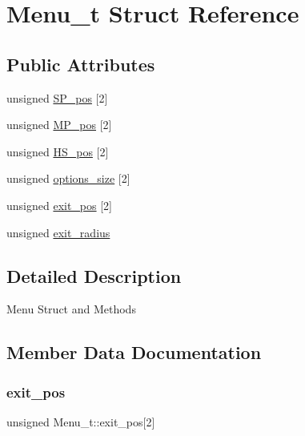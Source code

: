 \hypertarget{struct_menu__t}{}\section{Menu\+\_\+t Struct Reference}
\label{struct_menu__t}
\subsection*{Public Attributes}
\begin{DoxyCompactItemize}
\item 
unsigned \hyperlink{struct_menu__t_a73413f3fc2848f75e731c17a4ba51f74}{S\+P\+\_\+pos} \mbox{[}2\mbox{]}
\item 
unsigned \hyperlink{struct_menu__t_a252b5ddb2d7e97a790ef0a5d95af6078}{M\+P\+\_\+pos} \mbox{[}2\mbox{]}
\item 
unsigned \hyperlink{struct_menu__t_ae3ed027861d6123a178a82a6f60fdb74}{H\+S\+\_\+pos} \mbox{[}2\mbox{]}
\item 
unsigned \hyperlink{struct_menu__t_a7d1e90a9edc6dacce833bb39ab75e1e3}{options\+\_\+size} \mbox{[}2\mbox{]}
\item 
unsigned \hyperlink{struct_menu__t_ad826ecbf028d96d83976029b06fff7fb}{exit\+\_\+pos} \mbox{[}2\mbox{]}
\item 
unsigned \hyperlink{struct_menu__t_a6a89c2eaee92b6c3cc3359088fe6951f}{exit\+\_\+radius}
\end{DoxyCompactItemize}


\subsection{Detailed Description}
Menu Struct and Methods 

\subsection{Member Data Documentation}
\hypertarget{struct_menu__t_ad826ecbf028d96d83976029b06fff7fb}{}\label{struct_menu__t_ad826ecbf028d96d83976029b06fff7fb} 
\subsubsection{\texorpdfstring{exit\+\_\+pos}{exit\_pos}}
{\footnotesize\ttfamily unsigned Menu\+\_\+t\+::exit\+\_\+pos\mbox{[}2\mbox{]}}

\hypertarget{struct_menu__t_a6a89c2eaee92b6c3cc3359088fe6951f}{}\label{struct_menu__t_a6a89c2eaee92b6c3cc3359088fe6951f} 
